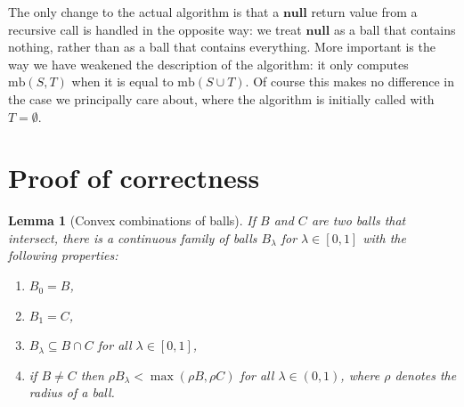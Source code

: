 \documentclass[a4paper]{article}
\newtheorem{lemma}{Lemma}[section]
\newcommand\undef{\mathbf{null}}
\newcommand\mb{\mathrm{mb}}
\let\boundary\partial
\let\radius\rho
\begin{document}
\noindent The only change to the actual algorithm is that a $\undef$ return value from a recursive call is handled in the opposite way: we treat $\undef$ as a ball that contains nothing, rather than as a ball that contains everything. More important is the way we have weakened the description of the algorithm: it only computes $\mb(S, T)$ when it is equal to $\mb(S\cup T)$. Of course this makes no difference in the case we principally care about, where the algorithm is initially called with $T=\emptyset$.

\section{Proof of correctness}
\begin{lemma}[Convex combinations of balls]\label{lemma:cc}
  If $B$ and $C$ are two balls that intersect, there is a continuous family of balls $B_\lambda$ for $\lambda\in[0,1]$ with the following properties:
  \def\theenumi{\normalfont\roman{enumi})}\let\labelenumi\theenumi
  \begin{enumerate}
    \item\label{item:cc:0} $B_0=B$,
    \item\label{item:cc:1} $B_1=C$,
    \item\label{item:cc:intersection} $B_\lambda\subseteq B\cap C$ for all $\lambda\in[0,1]$,
    \item\label{item:cc:radius} if $B\neq C$ then $\radius B_\lambda < \max(\radius B, \radius C)$ for all $\lambda\in(0,1)$, where $\radius$ denotes the radius of a ball.
  \end{enumerate}
\end{lemma}
\end{document}

